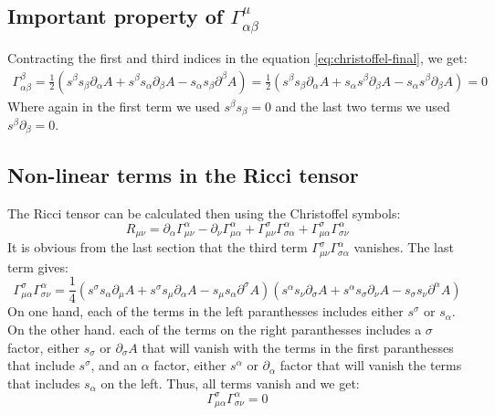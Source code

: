 \documentclass{article}
\begin{document}
\subsection{Important property of $\Gamma^\mu_{\alpha\beta}$}
Contracting the first and third indices in the equation \ref{eq:christoffel-final}, we get:
\begin{equation}
\begin{gathered}
    \Gamma^\beta_{\alpha\beta} = \frac{1}{2}
    \left(
        s^\beta s_\beta \partial_\alpha A 
        + s^\beta s_\alpha \partial_\beta A 
        - s_\alpha s_\beta \partial^\beta A 
    \right) = \frac{1}{2}
    \left(
        s^\beta s_\beta \partial_\alpha A 
        + s_\alpha s^\beta \partial_\beta A 
        - s_\alpha s^\beta \partial_\beta A 
    \right) = 0
\end{gathered}
\end{equation}
Where again in the first term we used $s^\beta s_\beta = 0$ and the last two terms we used $s^\beta \partial_\beta = 0$.

\subsection{Non-linear terms in the Ricci tensor}
The Ricci tensor can be calculated then using the Christoffel symbols:
\begin{equation}
    R_{\mu\nu} =
    \partial_\alpha \Gamma^\alpha_{\mu\nu}
    - \partial_\nu \Gamma^\alpha_{\mu\alpha}
    + \Gamma^\sigma_{\mu\nu} \Gamma^\alpha_{\sigma\alpha}
    + \Gamma^\sigma_{\mu\alpha} \Gamma^\alpha_{\sigma\nu}
\end{equation}
It is obvious from the last section that the third term $\Gamma^\sigma_{\mu\nu} \Gamma^\alpha_{\sigma\alpha}$ vanishes. The last term gives:
\begin{equation}
    \Gamma^\sigma_{\mu\alpha} \Gamma^\alpha_{\sigma\nu} = \frac{1}{4}
    \left(
        s^\sigma s_\alpha \partial_\mu A 
        + s^\sigma s_\mu \partial_\alpha A 
        - s_\mu s_\alpha \partial^\sigma A 
    \right)
    \left(
        s^\alpha s_\nu \partial_\sigma A 
        + s^\alpha s_\sigma \partial_\nu A 
        - s_\sigma s_\nu \partial^\alpha A 
    \right)
\end{equation}
On one hand, each of the terms in the left paranthesses includes either $s^\sigma$ or $s_\alpha$. On the other hand. each of the terms on the right paranthesses includes a $\sigma$ factor, either $s_\sigma$ or $\partial_\sigma A$ that will vanish with the terms in the first paranthesses that include $s^\sigma$, and an $\alpha$ factor, either $s^\alpha$ or $\partial_\alpha$ factor that will vanish the terms that includes $s_\alpha$ on the left. Thus, all terms vanish and we get:
\begin{equation}
    \Gamma^\sigma_{\mu\alpha} \Gamma^\alpha_{\sigma\nu} = 0
\end{equation}
\end{document}
